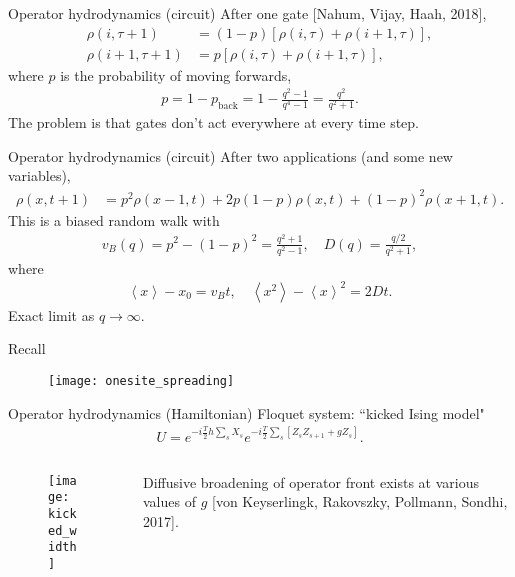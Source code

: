 \documentclass{beamer}
\newcommand{\ex}[1]{\left\langle #1 \right\rangle}
\renewcommand{\t}{\tau}
\newcommand{\nn}{\nonumber\\}
\begin{document}
\begin{frame}{Operator hydrodynamics (circuit)}
After one gate [Nahum, Vijay, Haah, 2018],
\begin{align}
\rho(i,\t+1) &= (1-p)\left[\rho(i,\t)+\rho(i+1,\t)\right],\nn
\rho(i+1,\t+1) &= p\left[\rho(i,\t)+\rho(i+1,\t)\right],\nonumber
\end{align}
where $p$ is the probability of moving forwards, 
\begin{align}
p = 1-p_\text{back} = 1-\frac{q^2-1}{q^4-1} = \frac{q^2}{q^2+1}. \nonumber
\end{align}
The problem is that gates don't act everywhere at every time step.
\end{frame}

\begin{frame}{Operator hydrodynamics (circuit)}
After two applications (and some new variables),
\begin{align}
\rho(x,t+1)&=p^2\rho(x-1,t)+2p(1-p)\rho(x,t)+(1-p)^2\rho(x+1,t).\nonumber
\end{align}
This is a biased random walk with
\begin{align}
v_B(q) = p^2 - (1-p)^2 = \frac{q^2 +1}{q^2-1},\quad D(q)=\frac{q/2}{q^2 +1},\nonumber
\end{align}
where
\begin{align}
\ex{x} -  x_0 = v_Bt,\quad \ex{x^2} - \ex{x}^2 = 2Dt.\nonumber
\end{align}
Exact limit as $q\to\infty$.
\end{frame}

\begin{frame}{Recall}
\begin{figure}
	\centering
	\texttt{[image: onesite\_spreading]}
\end{figure}
\end{frame}

\begin{frame}{Operator hydrodynamics (Hamiltonian)}
Floquet system: ``kicked Ising model"
\begin{align}
U = e^{-i \frac{T}{2} h \sum_s X_s} e^{-i\frac{T}{2}\sum_s[Z_sZ_{s+1} + gZ_s]}. \nonumber
\end{align}
\begin{columns}
	\begin{column}{0.4\textwidth}  %
		\begin{figure}
			\centering
			\texttt{[image: kicked\_width]}
		\end{figure}
	\end{column}
	\begin{column}{0.7\textwidth}
		Diffusive broadening of operator front exists at various values of $g$ [von Keyserlingk, Rakovszky, Pollmann, Sondhi, 2017].
	\end{column}
\end{columns}
\end{frame}
\end{document}
